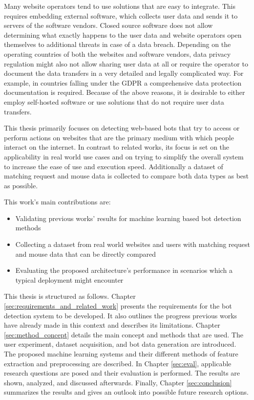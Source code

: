 \documentclass[
    fontsize=12pt,
    headings=small,
    parskip=half,           %
    bibliography=totoc,
    numbers=noenddot,       %
    open=any,               %
    final,                   %
    table
]{scrreprt}
\begin{document}
Many website operators tend to use solutions that are easy to integrate. This requires embedding external software, which collects user data and sends it to servers of the software vendors. Closed source software does not allow determining what exactly happens to the user data and website operators open themselves to additional threats in case of a data breach. Depending on the operating countries of both the websites and software vendors, data privacy regulation might also not allow sharing user data at all or require the operator to document the data transfers in a very detailed and legally complicated way. For example, in countries falling under the GDPR \cite{GDPR} a comprehensive data protection documentation is required. Because of the above reasons, it is desirable to either employ self-hosted software or use solutions that do not require user data transfers.

This thesis primarily focuses on detecting web-based bots that try to access or perform actions on websites that are the primary medium with which people interact on the internet. In contrast to related works, its focus is set on the applicability in real world use cases and on trying to simplify the overall system to increase the ease of use and execution speed. Additionally a dataset of matching request and mouse data is collected to compare both data types as best as possible.

This work's main contributions are:

\begin{itemize}
    \item Validating previous works' results for machine learning based bot detection methods
    \item Collecting a dataset from real world websites and users with matching request and mouse data that can be directly compared
    \item Evaluating the proposed architecture's performance in scenarios which a typical deployment might encounter
\end{itemize}

This thesis is structured as follows. Chapter \ref{sec:requirements_and_related_work} presents the requirements for the bot detection system to be developed. It also outlines the progress previous works have already made in this context and describes its limitations. Chapter \ref{sec:method_concept} details the main concept and methods that are used. The user experiment, dataset acquisition, and bot data generation are introduced. The proposed machine learning systems and their different methods of feature extraction and preprocessing are described. In Chapter \ref{sec:eval}, applicable research questions are posed and their evaluation is performed. The results are shown, analyzed, and discussed afterwards. Finally, Chapter \ref{sec:conclusion} summarizes the results and gives an outlook into possible future research options.
\end{document}
